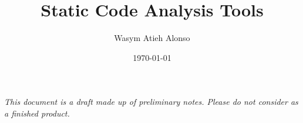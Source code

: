 \title{Static Code Analysis Tools}
\author{Wasym Atieh Alonso}
\date{\today}
\maketitle

\pagebreak

\textit{This document is a draft made up of preliminary notes. Please do not consider as a finished product.}

\pagebreak